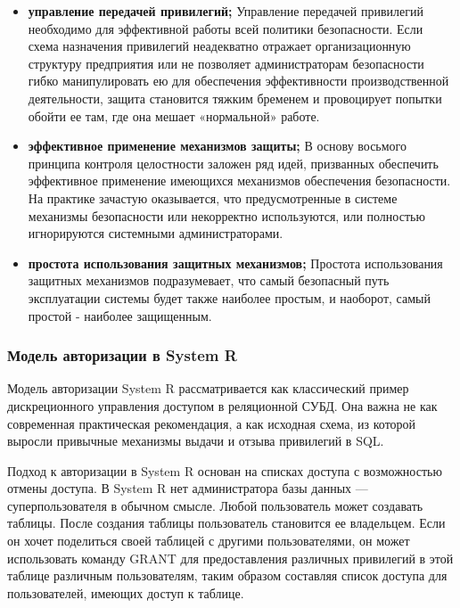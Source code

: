 \begin{itemize}
    заботиться о целостности данных, связанных с размещением боевого арсенала, который уже отправлен
    на переплавку. В связи с этим Кларк и Вильсон указывают на необходимость регулярных проверок,
    целью которых является выявление возможных несоответствий между защищаемыми данными и объективной
    реальностью, которую они отражают.
    \item \textbf{управление передачей привилегий;}
    Управление передачей привилегий необходимо для эффективной работы всей политики безопасности.
    Если схема назначения привилегий неадекватно отражает организационную структуру предприятия или
    не позволяет администраторам безопасности гибко манипулировать ею для обеспечения эффективности
    производственной деятельности, защита становится тяжким бременем и провоцирует попытки обойти ее
    там, где она мешает «нормальной» работе.
    \item \textbf{эффективное применение механизмов защиты;}
    В основу восьмого принципа контроля целостности заложен ряд идей, призванных обеспечить эффективное
    применение имеющихся механизмов обеспечения безопасности. На практике зачастую оказывается, что
    предусмотренные в системе механизмы безопасности или некорректно используются, или полностью
    игнорируются системными администраторами.
    \item \textbf{простота использования защитных механизмов;}
    Простота использования защитных механизмов подразумевает, что самый безопасный путь эксплуатации системы
    будет также наиболее простым, и наоборот, самый простой - наиболее защищенным.
\end{itemize}

\subsubsection{Модель авторизации в System R}
Модель авторизации System R рассматривается как классический пример дискреционного управления доступом
в реляционной СУБД. Она важна не как современная практическая рекомендация, а как исходная схема,
из которой выросли привычные механизмы выдачи и отзыва привилегий в SQL.

Подход к авторизации в System R основан на списках доступа с возможностью отмены доступа.
В System R нет администратора базы данных --- суперпользователя в обычном смысле. Любой пользователь может создавать таблицы.
После создания таблицы пользователь становится ее владельцем.
Если он хочет поделиться своей таблицей с другими пользователями, он может использовать команду GRANT для
предоставления различных привилегий в этой таблице различным пользователям, таким образом составляя
список доступа для пользователей, имеющих доступ к таблице.

